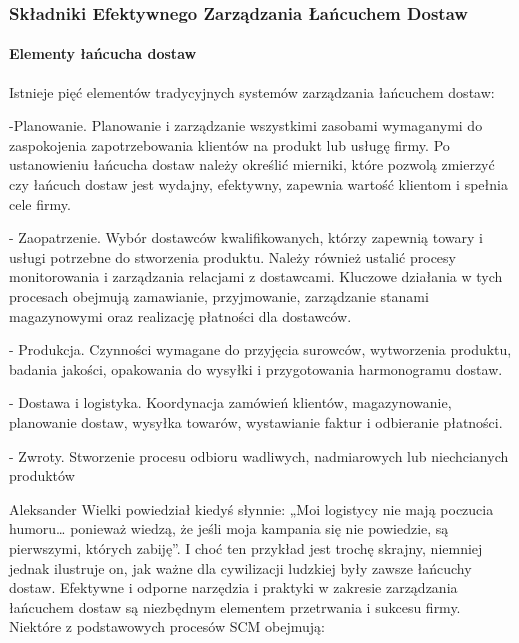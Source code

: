  

\vspace{\baselineskip}
\subsubsection{Składniki Efektywnego Zarządzania Łańcuchem Dostaw}


\paragraph{Elementy łańcucha dostaw}


Istnieje pięć elementów tradycyjnych systemów zarządzania łańcuchem dostaw:

    -Planowanie. Planowanie i zarządzanie wszystkimi zasobami wymaganymi do zaspokojenia zapotrzebowania klientów na produkt lub usługę firmy. Po ustanowieniu łańcucha dostaw należy określić mierniki, które pozwolą zmierzyć czy łańcuch dostaw jest wydajny, efektywny, zapewnia wartość klientom i spełnia cele firmy.
    
   - Zaopatrzenie. Wybór dostawców kwalifikowanych, którzy zapewnią towary i usługi potrzebne do stworzenia produktu. Należy również ustalić procesy monitorowania i zarządzania relacjami z dostawcami. Kluczowe działania w tych procesach obejmują zamawianie, przyjmowanie, zarządzanie stanami magazynowymi oraz realizację płatności dla dostawców.
    
   - Produkcja. Czynności wymagane do przyjęcia surowców, wytworzenia produktu, badania jakości, opakowania do wysyłki i przygotowania harmonogramu dostaw.
    
   - Dostawa i logistyka. Koordynacja zamówień klientów, magazynowanie, planowanie dostaw, wysyłka towarów, wystawianie faktur i odbieranie płatności.
    
   - Zwroty. Stworzenie procesu odbioru wadliwych, nadmiarowych lub niechcianych produktów\cite{wdx2023}



Aleksander Wielki powiedział kiedyś słynnie: „Moi logistycy nie mają poczucia humoru… ponieważ wiedzą, że jeśli moja kampania się nie powiedzie, są pierwszymi, których zabiję”. I choć ten przykład jest trochę skrajny, niemniej jednak ilustruje on, jak ważne dla cywilizacji ludzkiej były zawsze łańcuchy dostaw. Efektywne i odporne narzędzia i praktyki w zakresie zarządzania łańcuchem dostaw są niezbędnym elementem przetrwania i sukcesu firmy. Niektóre z podstawowych procesów SCM obejmują:   

